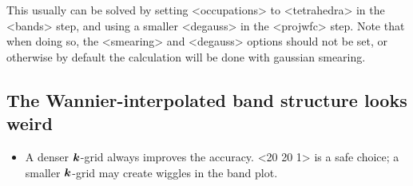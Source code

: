 \documentclass[hyperref, a4paper, 12pt]{report}
\def\texttt#1{<#1>}%
\newcommand{\shortcode}[1]{\texttt{#1}}
\begin{document}
This usually can be solved by 
setting \shortcode{occupations} to \shortcode{tetrahedra}
in the \shortcode{bands} step,
and using a smaller \shortcode{degauss} in the \shortcode{projwfc} step.
Note that when doing so, 
the \shortcode{smearing} and \shortcode{degauss} options 
should not be set, 
or otherwise by default the calculation will be done with gaussian smearing.

\subsection{The Wannier-interpolated band structure looks weird}

\begin{itemize}
    \item A denser $\vb*{k}$-grid always improves the accuracy. 
        \shortcode{20 20 1} is a safe choice; 
        a smaller $\vb*{k}$-grid may create wiggles in the band plot. 
\end{itemize}



\end{document}
